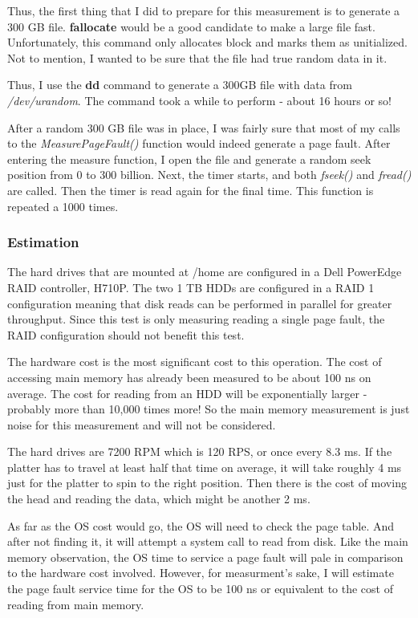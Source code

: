 \documentclass[paper=a4, fontsize=11pt]{scrartcl}
\numberwithin{equation}{section}        %
\numberwithin{figure}{section}          %
\numberwithin{table}{section}               %
\begin{document}
Thus, the first thing that I did to prepare for this measurement is to generate a 300 GB file.  \textbf{fallocate} would be a good candidate to make a large file fast.  Unfortunately, this command only allocates block and marks them as unitialized.  Not to mention, I wanted to be sure that the file had true random data in it.

Thus, I use the \textbf{dd} command to generate a 300GB file with data from \textit{/dev/urandom}.  The command took a while to perform - about 16 hours or so!

After a random 300 GB file was in place, I was fairly sure that most of my calls to the \textit{MeasurePageFault()} function would indeed generate a page fault.  After entering the measure function, I open the file and generate a random seek position from 0 to 300 billion.  Next, the timer starts, and both \textit{fseek()} and \textit{fread()} are called.  Then the timer is read again for the final time.  This function is repeated a 1000 times.

\subsubsection{Estimation}

The hard drives that are mounted at /home are configured in a Dell PowerEdge RAID controller, H710P.  The two 1 TB HDDs are configured in a RAID 1 configuration meaning that disk reads can be performed in parallel for greater throughput.  Since this test is only measuring reading a single page fault, the RAID configuration should not benefit this test.

The hardware cost is the most significant cost to this operation.  The cost of accessing main memory has already been measured to be about 100 ns on average.  The cost for reading from an HDD will be exponentially larger - probably more than 10,000 times more!  So the main memory measurement is just noise for this measurement and will not be considered.

The hard drives are 7200 RPM which is 120 RPS, or once every 8.3 ms.  If the platter has to travel at least half that time on average, it will take roughly 4 ms just for the platter to spin to the right position.  Then there is the cost of moving the head and reading the data, which might be another 2 ms.

As far as the OS cost would go, the OS will need to check the page table.  And after not finding it, it will attempt a system call to read from disk.  Like the main memory observation, the OS time to service a page fault will pale in comparison to the hardware cost involved.  However, for measurment's sake, I will estimate the page fault service time for the OS to be 100 ns or equivalent to the cost of reading from main memory.
\end{document}
